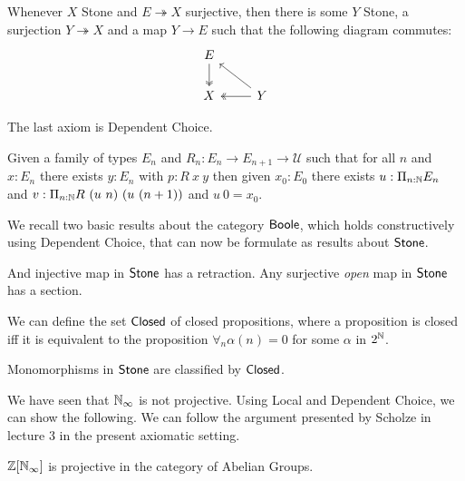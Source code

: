 \begin{axiom}
  Whenever $X$ Stone and $E\twoheadrightarrow X$ surjective, then there is some $Y$ Stone,
    a surjection $Y \twoheadrightarrow X$ and a map $Y\to E$ such that the following diagram commutes:
    \begin{equation}\begin{tikzcd}
      E \arrow[d,""',two heads]\\
      X & \arrow[l, "", two heads] Y\arrow[lu, ""']
    \end{tikzcd}\end{equation}  
\end{axiom} 




The last axiom is Dependent Choice.

\begin{axiom}
  Given a family of types $E_n$ and $R_n:E_n\rightarrow E_{n+1}\rightarrow {\mathcal U}$ such that
  for all $n$ and $x:E_n$ there exists $y:E_n$ with $p:R~x~y$ then given $x_0:E_0$ there exists
  $u:\Pi_{n:\mathbb{N}}E_n$ and $v:\Pi_{n:\mathbb{N}}R~(u~n)~(u~(n+1))$ and $u~0 = x_0$.
\end{axiom}

\medskip

We recall two basic results about the category $\mathsf{Boole}$, which holds constructively using Dependent Choice,
that can now be formulate as results about $\mathsf{Stone}$.

\begin{proposition}
  And injective map in $\mathsf{Stone}$ has a retraction. Any surjective {\em open} map in $\mathsf{Stone}$ has a section.
\end{proposition}

\medskip

We can define the set $\mathsf{Closed}$ of closed propositions, where a proposition is closed iff it is equivalent to
the proposition $\forall_n \alpha(n) = 0$ for some $\alpha$ in $2^{\mathbb{N}}$.

\begin{theorem}
  Monomorphisms in $\mathsf{Stone}$ are classified by $\mathsf{Closed}$.
\end{theorem}

\medskip

We have seen that $\mathbb{N}_{\infty}$ is not projective. Using Local and Dependent Choice, we can show the following.
We can follow the argument presented by Scholze in lecture 3 in the present axiomatic setting.

\begin{theorem}
  $\mathbb{Z}[\mathbb{N}_{\infty}]$ is projective in the category of Abelian Groups.
\end{theorem}

